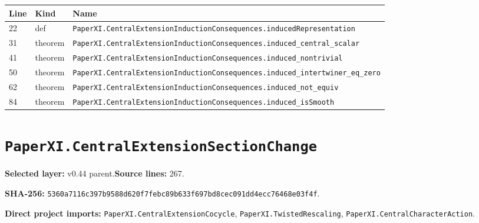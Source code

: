 \documentclass[10pt,oneside]{book}
\begin{document}
\begin{longtable}{@{}p{}p{}p{}@{}}\toprule Line&Kind&Name\\\midrule\endhead

22&def&\nolinkurl{PaperXI.CentralExtensionInductionConsequences.inducedRepresentation}\\

31&theorem&\nolinkurl{PaperXI.CentralExtensionInductionConsequences.induced_central_scalar}\\

41&theorem&\nolinkurl{PaperXI.CentralExtensionInductionConsequences.induced_nontrivial}\\

50&theorem&\nolinkurl{PaperXI.CentralExtensionInductionConsequences.induced_intertwiner_eq_zero}\\

62&theorem&\nolinkurl{PaperXI.CentralExtensionInductionConsequences.induced_not_equiv}\\

84&theorem&\nolinkurl{PaperXI.CentralExtensionInductionConsequences.induced_isSmooth}\\

\bottomrule\end{longtable}

\section{\texorpdfstring{\nolinkurl{PaperXI.CentralExtensionSectionChange}}{PaperXI.CentralExtensionSectionChange}}\label{module:PaperXI.CentralExtensionSectionChange}

\textbf{Selected layer:} v0.44 parent.\quad\textbf{Source lines:} 267.\par\textbf{SHA-256:} {\scriptsize\nolinkurl{5360a7116c397b9588d620f7febc89b633f697bd8cec091dd4ecc76468e03f4f}}.


\textbf{Direct project imports:} \nolinkurl{PaperXI.CentralExtensionCocycle}, \nolinkurl{PaperXI.TwistedRescaling}, \nolinkurl{PaperXI.CentralCharacterAction}.
\end{document}
